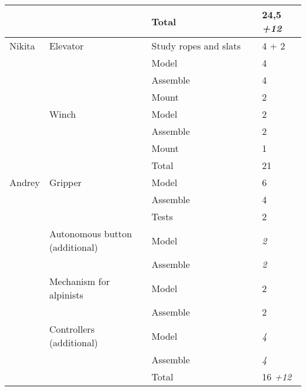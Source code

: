 \begin{table}[H]
\begin{center}
\begin{tabular}{|p{0.12\linewidth}|p{0.35\linewidth}|p{0.38\linewidth}|p{0.15\linewidth}|}
			\hline                                
			& & Total	& 24,5 \textit{+12}\\                        
			\hline
			\hline                                            
			Nikita	& Elevator	& Study ropes and slats	& 4 + 2 \\        
			& & Model &	4 \\
			& & Assemble & 4 \\                                  
			& & Mount & 2 \\
			\hline                                     
			& Winch & Model & 2 \\                               
			& & Assemble & 2 \\                                 
			& & Mount & 1 \\                                     
			& & Total & 21 \\                                   
			\hline
			\hline                                            
			Andrey & Gripper & Model & 6 \\                             
			& & Assemble & 4 \\                
			& & Tests & 2 \\                                   
			\hline
			& Autonomous button (additional)	& Model & \textit{2} \\                   
			& & Assemble & \textit{2} \\             
			\hline
			& Mechanism for alpinists & Model & 2 \\             
			& & Assemble & 2 \\                                  
			\hline
			& Controllers (additional) & Model & \textit{4} \\                        
			& & Assemble & \textit{4} \\
			\hline                                  
			& & Total & 16 \textit{+12} \\                              
			
			\hline
		\end{tabular}
	\end{center}
\end{table} 
